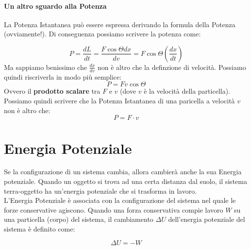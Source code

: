         \paragraph{Un altro sguardo alla Potenza} La Potenza Istantanea può 
        essere espressa derivando la formula della Potenza (ovviamente!). Di 
        conseguenza possiamo scrivere la potenza come:

        \begin{equation*}
            P = \frac{dL}{dt} = \frac{F \cos \Theta dx}{dv} 
            = F \cos \Theta (\frac{dx}{dt})
        \end{equation*}
        Ma sappiamo benissimo che $\frac{dx}{dv}$ non è altro che la definzione 
        di velocità. Possiamo quindi riscriverla in modo più semplice:
        \begin{equation*}
            P = Fv\cos\Theta
        \end{equation*}
        Ovvero il \textbf{prodotto scalare} tra $F$ e $v$ (dove $v$ è la 
        velocità della particella). Possiamo quindi scrivere che la Potenza 
        Istantanea di una paricella a velocità $v$ non è altro che:
        \begin{equation}
            P = F \cdot v
        \end{equation}

    \section{Energia Potenziale} Se la configurazione di un sistema cambia, 
    allora cambierà anche la sua Energia potenziale. Quando un oggetto si trova
    ad una certa distanza dal suolo, il sistema terra-oggetto ha un'energia 
    potenziale che si trasforma in lavoro. \\
    L'Energia Potenziale è associata con la configurazione del sistema nel quale
    le forze conservative agiscono. Quando una forza conservativa compie lavoro
    $W$ su una particella (corpo) del sistema, il cambiamento $\Delta U$ 
    dell'energia potenziale del sistema è definito come:
        
        \begin{equation}
            \Delta U = - W
        \end{equation}

